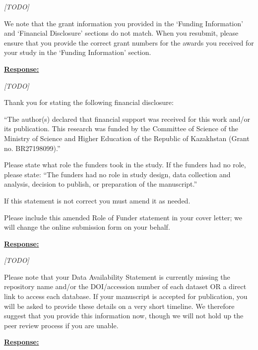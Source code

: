 \documentclass{article}
\begin{document}
\emph{[TODO]}

\vspace{0.3cm}

\begin{cmt}{}{}

We note that the grant information you provided in the `Funding Information'
and `Financial Disclosure' sections do not match.
When you resubmit, please ensure that you provide the correct grant numbers for
the awards you received for your study in the `Funding Information' section.

\end{cmt}
\vspace{0.1cm}
\noindent
\underline{\textbf{Response:}}
\vspace{0.2cm}

\emph{[TODO]}

\vspace{0.3cm}


\begin{cmt}{}{}

Thank you for stating the following financial disclosure:

``The author(s) declared that financial support was received for this work
and/or its publication. This research was funded by the Committee of Science of
the Ministry of Science and Higher Education of the Republic of Kazakhstan
(Grant no. BR27198099).''

Please state what role the funders took in the study. If the funders had no
role, please state: ``The funders had no role in study design, data collection
and analysis, decision to publish, or preparation of the manuscript.''

If this statement is not correct you must amend it as needed.

Please include this amended Role of Funder statement in your cover letter; we
will change the online submission form on your behalf.

\end{cmt}
\vspace{0.1cm}
\noindent
\underline{\textbf{Response:}}
\vspace{0.2cm}

\emph{[TODO]}

\vspace{0.3cm}


\begin{cmt}{}{}

Please note that your Data Availability Statement is currently missing the
repository name and/or the DOI/accession number of each dataset OR a direct link
to access each database. If your manuscript is accepted for publication, you
will be asked to provide these details on a very short timeline. We therefore
suggest that you provide this information now, though we will not hold up the
peer review process if you are unable.

\end{cmt}
\vspace{0.1cm}
\noindent
\underline{\textbf{Response:}}
\vspace{0.2cm}
\end{document}
